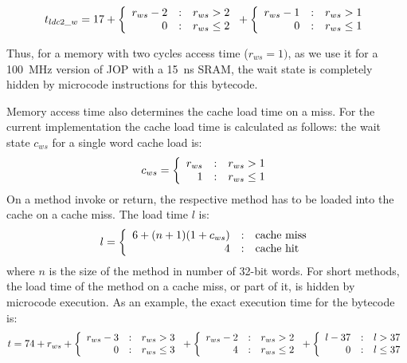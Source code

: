 \begin{equation*}
    t_{ldc2\_w} = 17+\left\{\begin{array}{r@{\quad:\quad}l}
    r_{ws}-2 & r_{ws}>2 \\
    0   & r_{ws}\le2
    \end{array} \right.
    +
    \left\{\begin{array}{r@{\quad:\quad}l}
    r_{ws}-1 & r_{ws}>1 \\
    0   & r_{ws}\le1
    \end{array} \right.
\end{equation*}

Thus, for a memory with two cycles access time ($r_{ws}=1)$, as we
use it for a 100~MHz version of JOP with a 15~ns SRAM, the wait state
is completely hidden by microcode instructions for this bytecode.

Memory access time also determines the cache load time on a miss. For
the current implementation the cache load time is calculated as
follows: the wait state $c_{ws}$ for a single word cache load is:
\begin{equation*}
    c_{ws} =
    \left\{\begin{array}{r@{\quad:\quad}l}
    r_{ws} & r_{ws}>1 \\
    1   & r_{ws}\le1
    \end{array} \right.
\end{equation*}
%
On a method invoke or return, the respective method has to be loaded
into the cache on a cache miss. The load time $l$ is:
\[
    l =
    \left\{\begin{array}{r@{\quad:\quad}l}
    6+(n+1)(1+c_{ws}) & \mbox{cache miss} \\
    4   & \mbox{cache hit}
    \end{array} \right.
\]
where $n$ is the size of the method in number of 32-bit words. For
short methods, the load time of the method on a cache miss, or part
of it, is hidden by microcode execution. As an example, the exact
execution time for the bytecode  is:
%
\begin{equation*}
    t = 74+r_{ws}+
    \left\{\begin{array}{r@{\quad:\quad}l}
    r_{ws}-3 & r_{ws}>3 \\
    0   & r_{ws}\le3
    \end{array} \right.
    +
    \left\{\begin{array}{r@{\quad:\quad}l}
    r_{ws}-2 & r_{ws}>2 \\
    4   & r_{ws}\le2
    \end{array} \right.
    +
    \left\{\begin{array}{r@{\quad:\quad}l}
    l-37 & l>37 \\
    0   & l\le37
    \end{array} \right.
\end{equation*}
%

